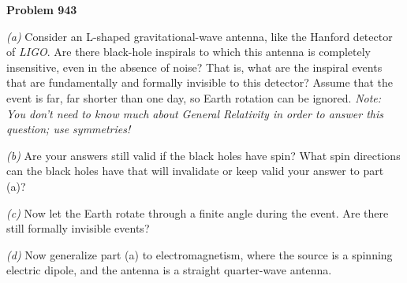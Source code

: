 \documentclass[12pt]{article}
\begin{document}
\pagecolor{advancedcolor}\begin{pottproblem}
\textbf{Problem 943}

\textsl{(a)}
Consider an L-shaped gravitational-wave antenna, like the Hanford detector
of \textsl{LIGO}.
Are there black-hole inspirals to which this antenna is completely insensitive,
even in the absence of noise?
That is, what are the inspiral events that are fundamentally and formally invisible to this
detector?
Assume that the event is far, far shorter than one day, so Earth rotation can be ignored.
\emph{Note: You don't need to know much about General Relativity in order to answer this question; use symmetries!}

\textsl{(b)}
Are your answers still valid if the black holes have spin?
What spin directions can the black holes have that will invalidate
or keep valid your answer to part (a)?

\textsl{(c)}
Now let the Earth rotate through a finite angle during the event.
Are there still formally invisible events?

\textsl{(d)}
Now generalize part (a) to electromagnetism, where the source is a 
spinning electric dipole, and the antenna is a straight quarter-wave antenna.

\end{pottproblem}
\end{document}
